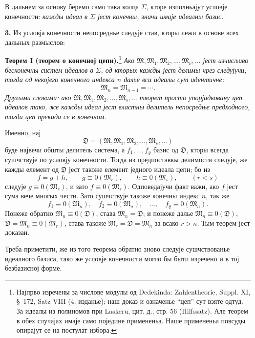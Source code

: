 ﻿\documentclass[11pt]{article}
\newcommand{\ideal}[1]{\mathfrak{#1}}
\begin{document}
В дальнем за основу беремо само така колца \(\Sigma\), кторе изполньајут условје конечности: \emph{кажды идеал в \(\Sigma\) јест конечны, значи имаје идеалны базис.}

\textbf{3.} Из условја конечности непосреднье следује став, кторы лежи в основе всех дальных размыслов:

\textbf{Теорем I (теорем о конечној цепи).}\footnote{Најпрво изречены за числове модулы од Dedekinda: Zahlentheorie, Suppl. XI, \S~172, Satz VIII (4. изданье); наш доказ и означенье ``цеп'' сут взяте одтуд. За идеалы из полиномов при Laskeru, цит. д., стр. 56 (Hilfssatz). Але теорем в обех случајах имаје само поједине примененьа. Наше примененьа повсуды опирајут се на постулат избора.}
\emph{Ако \(\ideal M,\ideal M_1,\ideal M_2,\ldots,\ideal M_\nu,\ldots\) јест изчисљиво бесконечны систем идеалов в \(\Sigma\), од кторых кажды јест делимы чрез следујучи, тогда од некојего конечного индекса \(n\) далье вси идеалы сут идентичне:
\[
 \ideal M_n=\ideal M_{n+1}=\cdots.
\]
Другыми словами: ако \(\ideal M,\ideal M_1,\ideal M_2,\ldots,\ideal M_s,\ldots\) творет просто упорјадковану цеп идеалов тако, же кажды идеал јест властны делитель непосредње предходного, тогда цеп прекида се в конечном.}

Именно, нај
\[
 \ideal D=(\ideal M,\ideal M_1,\ideal M_2,\ldots,\ideal M_\nu,\ldots)
\]
буде највечи обшты делитель система, а \(f_1,\ldots,f_\varrho\) базис од \(\ideal D\), кторы всегда сушчствује по условју конечности. Тогда из предпоставкы делимости следује, же кажды елемент од \(\ideal D\) јест такоже елемент једного идеала цепи; бо из
\[
 f=g+h,\qquad g\equiv0(\ideal M_r),\qquad h\equiv0(\ideal M_s),\qquad (r<s)
\]
следује \(g\equiv0(\ideal M_s)\), и зато \(f\equiv0(\ideal M_s)\). Одповедајучи факт важи, ако \(f\) јест сума вече многых чести. Зато сушчствује такоже конечны индекс \(n\), так же
\[
 f_1\equiv0(\ideal M_n),\quad f_2\equiv0(\ideal M_n),\quad\ldots,\quad f_\varrho\equiv0(\ideal M_n).
\]
Понеже обратно \(\ideal M_n\equiv0(\ideal D)\), става \(\ideal M_n=\ideal D\); и понеже далье \(\ideal M_n\equiv0(\ideal D)\), \(\ideal D=\ideal M_n\equiv0(\ideal M_r)\), става такоже \(\ideal M_r=\ideal D=\ideal M_n\) за всако \(r>n\). Тым теорем јест доказан.

Треба приметити, же из того теорема обратно зново следује сушчствованье идеалного базиса, тако же условје конечности могло бы быти изречено и в тој безбазисној форме.

\clearpage
\end{document}
